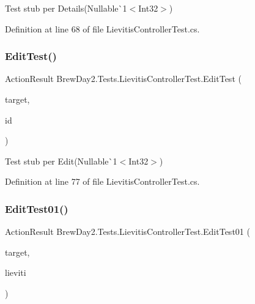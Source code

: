 Test stub per Details(Nullable\`{}1$<$Int32$>$)



Definition at line 68 of file Lievitis\+Controller\+Test.\+cs.

\mbox{\label{class_brew_day2_1_1_tests_1_1_lievitis_controller_test_a0ceca90325bbc8c95d845bdeff5a701f}} 
\subsubsection{\texorpdfstring{Edit\+Test()}{EditTest()}}
{\footnotesize\ttfamily Action\+Result Brew\+Day2.\+Tests.\+Lievitis\+Controller\+Test.\+Edit\+Test (\begin{DoxyParamCaption}\item[{\mbox{[}\+Pex\+Assume\+Under\+Test\mbox{]} \mbox{\hyperlink{class_brew_day2_1_1_controllers_1_1_lievitis_controller}{Lievitis\+Controller}}}]{target,  }\item[{int?}]{id }\end{DoxyParamCaption})}



Test stub per Edit(Nullable\`{}1$<$Int32$>$)



Definition at line 77 of file Lievitis\+Controller\+Test.\+cs.

\mbox{\label{class_brew_day2_1_1_tests_1_1_lievitis_controller_test_a77ecec084bcf2a2b506ff19b622e88b2}} 
\subsubsection{\texorpdfstring{Edit\+Test01()}{EditTest01()}}
{\footnotesize\ttfamily Action\+Result Brew\+Day2.\+Tests.\+Lievitis\+Controller\+Test.\+Edit\+Test01 (\begin{DoxyParamCaption}\item[{\mbox{[}\+Pex\+Assume\+Under\+Test\mbox{]} \mbox{\hyperlink{class_brew_day2_1_1_controllers_1_1_lievitis_controller}{Lievitis\+Controller}}}]{target,  }\item[{\mbox{\hyperlink{class_brew_day2_1_1_models_1_1_lieviti}{Lieviti}}}]{lieviti }\end{DoxyParamCaption})}



